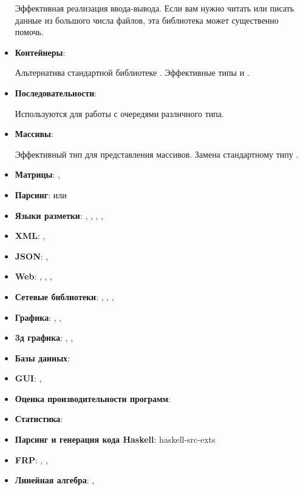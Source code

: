 \begin{itemize}
    Эффективная реализация ввода-вывода. Если вам нужно читать 
    или писать данные из большого числа файлов, эта библиотека 
    может существенно помочь.

\item \textbf{Контейнеры}: 

    Альтернатива стандартной библиотеке . 
    Эффективные типы  и .  

\item \textbf{Последовательности}: 

    Используются для работы с очередями различного типа.

\item \textbf{Массивы}: 

    Эффективный тип для представления массивов. Замена
    стандартному типу .

\item \textbf{Матрицы}: , 

\end{itemize}




\begin{itemize}

\item \textbf{Парсинг}:  или 
\item \textbf{Языки разметки}: , , , 
        , 
\item \textbf{XML}: , 
\item \textbf{JSON}: , 
\item \textbf{Web}: , , , 
\item \textbf{Сетевые библиотеки}: , , , 

\item \textbf{Графика}: , , 
\item \textbf{3д графика}: , ,  

\item \textbf{Базы данных}: 


\item \textbf{GUI}: , 

\item \textbf{Оценка производительности программ}: 

\item \textbf{Статистика}: 

\item \textbf{Парсинг и генерация кода Haskell}: haskell-src-exts

\item \textbf{FRP}: , , 

\item \textbf{Линейная алгебра}: , 

\end{itemize}
